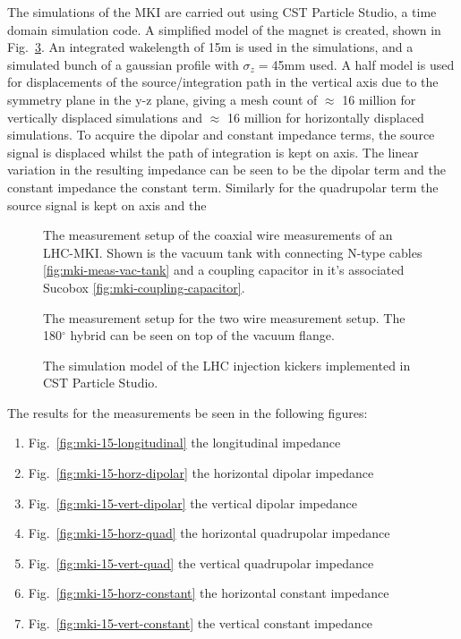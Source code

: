 The simulations of the MKI are carried out using CST Particle Studio, a time domain simulation code. A simplified model of the magnet is created, shown in Fig.~\ref{fig:mki-simulation-model}. An integrated wakelength of 15m is used in the simulations, and a simulated bunch of a gaussian profile with $\sigma_{z}=$45mm used. A half model is used for displacements of the source/integration path in the vertical axis due to the symmetry plane in the y-z plane, giving a mesh count of $\approx$ 16 million for vertically displaced simulations and $\approx$ 16 million for horizontally displaced simulations. To acquire the dipolar and constant impedance terms, the source signal is displaced whilst the path of integration is kept on axis. The linear variation in the resulting impedance can be seen to be the dipolar term and the constant impedance the constant term. Similarly for the quadrupolar term the source signal is kept on axis and the 

\begin{figure}
\subfigure[]{
\label{fig:mki-meas-vac-tank}
}
\subfigure[]{
\label{fig:mki-coupling-capacitor}
}
\label{fig:mki-meas-setup}
\caption{The measurement setup of the coaxial wire measurements of an LHC-MKI. Shown is the vacuum tank with connecting N-type cables \ref{fig:mki-meas-vac-tank} and a coupling capacitor in it's associated Sucobox \ref{fig:mki-coupling-capacitor}.}
\end{figure}

\begin{figure}
\label{fig:mki-meas-two-wire}
\caption{The measurement setup for the two wire measurement setup. The 180$^{\circ}$ hybrid can be seen on top of the vacuum flange.}
\end{figure}

\begin{figure}
\label{fig:mki-simulation-model}
\caption{The simulation model of the LHC injection kickers implemented in CST Particle Studio.}
\end{figure}


The results for the measurements be seen in the following figures:
\begin{enumerate}
\item{Fig.~\ref{fig:mki-15-longitudinal} the longitudinal impedance}
\item{Fig.~\ref{fig:mki-15-horz-dipolar} the horizontal dipolar impedance}
\item{Fig.~\ref{fig:mki-15-vert-dipolar} the vertical dipolar impedance}
\item{Fig.~\ref{fig:mki-15-horz-quad} the horizontal quadrupolar impedance}
\item{Fig.~\ref{fig:mki-15-vert-quad} the vertical quadrupolar impedance}
\item{Fig.~\ref{fig:mki-15-horz-constant} the horizontal constant impedance}
\item{Fig.~\ref{fig:mki-15-vert-constant} the vertical constant impedance}
\end{enumerate}

